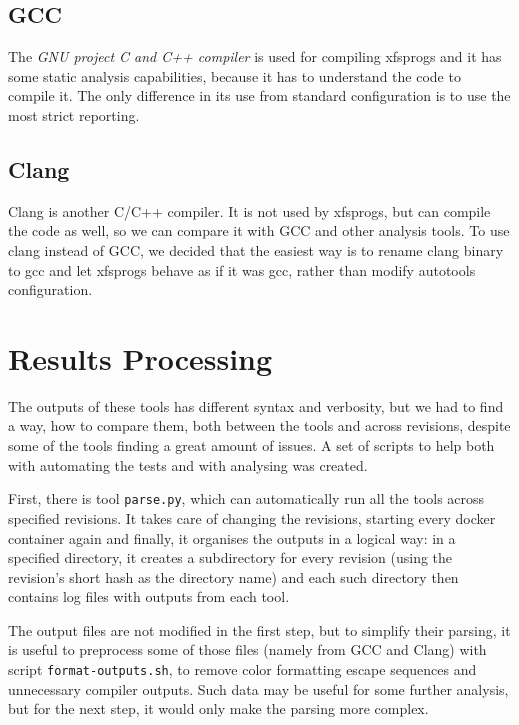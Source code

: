 \subsection{GCC}
The {\em GNU project C and C++ compiler} is used for compiling xfsprogs and it
has some static analysis capabilities, because it has to understand the code to
compile it. The only difference in its use from standard configuration is to
use the most strict reporting.

\subsection{Clang}
Clang is another C/C++ compiler. It is not used by xfsprogs, but can compile
the code as well, so we can compare it with GCC and other analysis tools. To use
clang instead of GCC, we decided that the easiest way is to rename clang binary
to gcc and let xfsprogs behave as if it was gcc, rather than modify autotools
configuration.

\section{Results Processing}\label{chap:techniques:processing}
The outputs of these tools has different syntax and verbosity, but we had to
find a way, how to compare them, both between the tools and across revisions,
     despite some of the tools finding a great amount of issues. A set of
     scripts to help both with automating the tests and with analysing was
     created.

First, there is tool {\tt parse.py}, which can automatically run all the tools
across specified revisions. It takes care of changing the revisions, starting
every docker container again and finally, it organises the outputs in a logical
way: in a specified directory, it creates a subdirectory for every revision
(using the revision's short hash as the directory name) and each such directory
then contains log files with outputs from each tool.

The output files are not modified in the first step, but to simplify their
parsing, it is useful to preprocess some of those files (namely from GCC and
							 Clang) with script
{\tt format-outputs.sh}, to remove color formatting escape sequences and
unnecessary compiler outputs.  Such data may be useful for some further
analysis, but for the next step, it would only make the parsing more complex.

